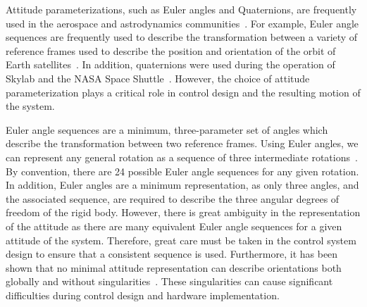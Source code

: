 \documentclass[10pt,fleqn]{IJCAS}  %
\begin{document}
\begin{multicols}{2}
Attitude parameterizations, such as Euler angles and Quaternions, are frequently used in the aerospace and astrodynamics communities~\cite{vallado2007}.
For example, Euler angle sequences are frequently used to describe the transformation between a variety of reference frames used to describe the position and orientation of the orbit of Earth satellites~\cite{vallado2007}.
In addition, quaternions were used during the operation of Skylab and the NASA Space Shuttle~\cite{hughes2004}.
However, the choice of attitude parameterization plays a critical role in control design and the resulting motion of the system.

Euler angle sequences are a minimum, three-parameter set of angles which describe the transformation between two reference frames.
Using Euler angles, we can represent any general rotation as a sequence of three intermediate rotations~\cite{shuster1993}.
By convention, there are \num{24} possible Euler angle sequences for any given rotation.
In addition, Euler angles are a minimum representation, as only three angles, and the associated sequence, are required to describe the three angular degrees of freedom of the rigid body.
However, there is great ambiguity in the representation of the attitude as there are many equivalent Euler angle sequences for a given attitude of the system.
Therefore, great care must be taken in the control system design to ensure that a consistent sequence is used. 
Furthermore, it has been shown that no minimal attitude representation can describe orientations both globally and without singularities~\cite{hughes2004,bhat2000}.
These singularities can cause significant difficulties during control design and hardware implementation.


\end{multicols}
\end{document}
